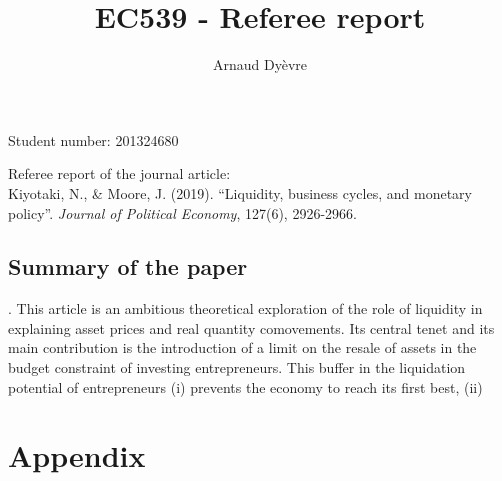 \documentclass{amsart}
\theoremstyle{definition}
\theoremstyle{remark}
\numberwithin{equation}{section}
\begin{document}
\title{EC539 - Referee report}

\author{Arnaud Dy\`evre}







\maketitle

\begin{center}
Student number: 201324680
\end{center}


\vspace{12pt}

Referee report of the journal article: \\ 
Kiyotaki, N., \& Moore, J. (2019). ``Liquidity, business cycles, and monetary policy''. \textit{Journal of Political Economy}, 127(6), 2926-2966.

\newpage 

\subsection*{Summary of the paper}. This article is an ambitious theoretical exploration of the role of liquidity in explaining asset prices and real quantity comovements. Its central tenet and its main contribution is the introduction of a limit on the resale of assets in the budget constraint of investing entrepreneurs. This buffer in the liquidation potential of entrepreneurs (i) prevents the economy to reach its first best, (ii) \\

\newpage




\newpage

\section*{Appendix}
\end{document}
